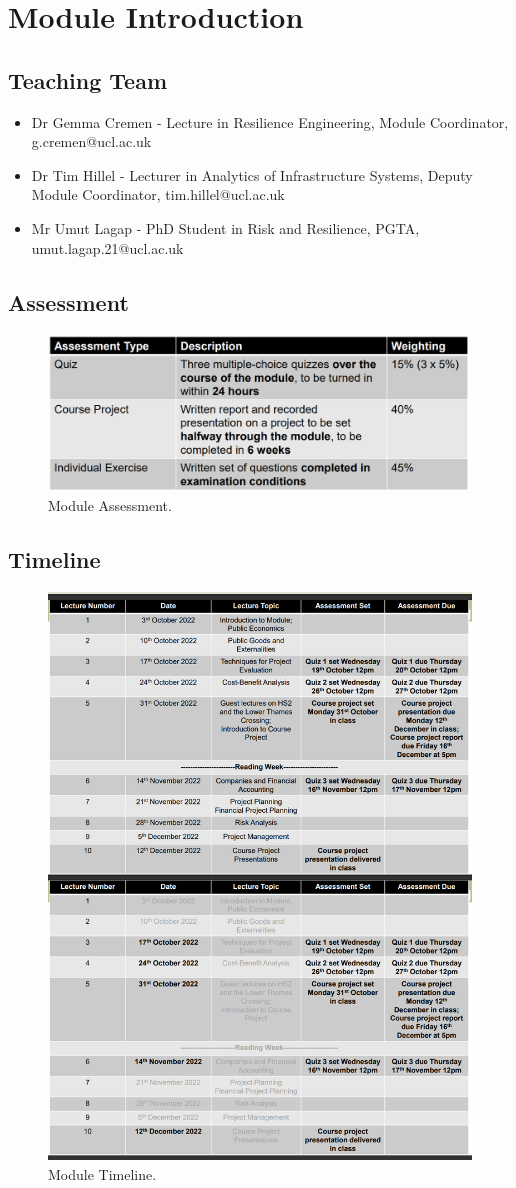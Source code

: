 \documentclass[class=report, crop=false, 12pt,a4paper]{standalone}
\begin{document}
\section{Module Introduction}
\subsection{Teaching Team}
\begin{itemize}
	\item Dr Gemma Cremen - Lecture in Resilience Engineering, Module Coordinator, g.cremen@ucl.ac.uk
	\item Dr Tim Hillel - Lecturer in Analytics of Infrastructure Systems, Deputy Module Coordinator, tim.hillel@ucl.ac.uk
	\item Mr Umut Lagap - PhD Student in Risk and Resilience, PGTA, umut.lagap.21@ucl.ac.uk
\end{itemize}
\subsection{Assessment}
\begin{figure}
	\centering
	\includegraphics[width = 0.9 \textwidth]{../img/figure1.png}
	\caption{Module Assessment.}
\end{figure}
\subsection{Timeline}
\begin{figure}
	\centering
	\includegraphics[width = 0.9 \textwidth]{../img/figure2.png}
	\caption{Module Timeline.}
\end{figure}
\end{document}
